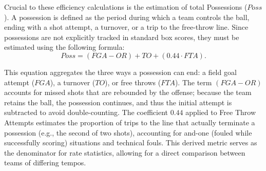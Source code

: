 \documentclass[12pt,leqno]{article}\usepackage[pdftex]{graphicx}\usepackage[usenames,dvipsnames]{xcolor}
\theoremstyle{remark}
\begin{document}
Crucial to these efficiency calculations is the estimation of total Possessions ($Poss$). A possession is defined as the period during which a team controls the ball, ending with a shot attempt, a turnover, or a trip to the free-throw line.  Since possessions are not explicitly tracked in standard box scores, they must be estimated using the following formula: \begin{equation}Poss = (FGA - OR) + TO + (0.44 \cdot FTA).\end{equation}

This equation aggregates the three ways a possession can end: a field goal attempt ($FGA$), a turnover ($TO$), or free throws ($FTA$). The term $(FGA - OR)$ accounts for missed shots that are rebounded by the offense; because the team retains the ball, the possession continues, and thus the initial attempt is subtracted to avoid double-counting. The coefficient $0.44$ applied to Free Throw Attempts estimates the proportion of trips to the line that actually terminate a possession (e.g., the second of two shots), accounting for and-one (fouled while successfully scoring) situations and technical fouls. This derived metric serves as the denominator for rate statistics, allowing for a direct comparison between teams of differing tempos.
\end{document}
